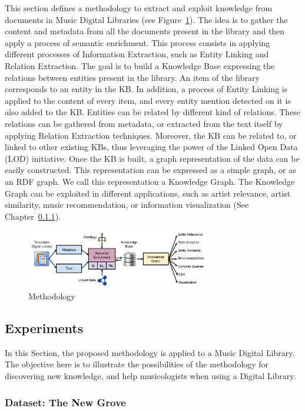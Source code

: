 This section defines a methodology to extract and exploit knowledge from documents in Music Digital Libraries (see Figure~\ref{fig:musicology:methodology-dl}). The idea is to gather the content and metadata from all the documents present in the library and then apply a process of semantic enrichment. This process consists in applying different processes of Information Extraction, such as Entity Linking and Relation Extraction. The goal is to build a Knowledge Base expressing the relations between entities present in the library. 
An item of the library corresponds to an entity in the KB. In addition, a process of Entity Linking is applied to the content of every item, and every entity mention detected on it is also added to the KB. Entities can be related by different kind of relations. These relations can be gathered from metadata, or extracted from the text itself by applying Relation Extraction techniques. Moreover, the KB can be related to, or linked to other existing KBs, thus leveraging the power of the Linked Open Data (LOD) initiative. 
Once the KB is built, a graph representation of the data can be easily constructed. This representation can be expressed as a simple graph, or as an RDF graph. We call this representation a Knowledge Graph. The Knowledge Graph can be exploited in different applications, such as artist relevance, artist similarity, music recommendation, or information visualization (See Chapter~\ref{}).

\begin{figure}[!ht]
	\centering
	\includegraphics[width=8cm]{ch05_musicology_pics/methodology-dl.jpg}
	\caption{Methodology
	\label{fig:musicology:methodology-dl}}
\end{figure}

\subsection{Experiments}

In this Section, the proposed methodology is applied to a Music Digital Library. The objective here is to illustrate the possibilities of the methodology for discovering new knowledge, and help musicologists when using a Digital Library.

\subsubsection{Dataset: The New Grove}

